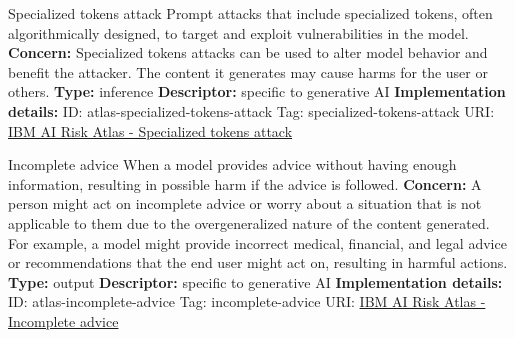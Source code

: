 \begin{definitionbox}{Specialized tokens attack}
Prompt attacks that include specialized tokens, often algorithmically designed, to target and exploit vulnerabilities in the model.\newline\newline
\textbf{Concern: }Specialized tokens attacks can be used to alter model behavior and benefit the attacker. The content it generates may cause harms for the user or others.\newline\newline
\textbf{Type: }inference\newline
\textbf{Descriptor: }specific to generative AI \newline\newline
\textbf{Implementation details: } \newline
ID: atlas-specialized-tokens-attack \newline
Tag: specialized-tokens-attack \newline
URI:  \href{https://www.ibm.com/docs/en/watsonx/saas?topic=SSYOK8/wsj/ai-risk-atlas/specialized-tokens-attack.html}{IBM AI Risk Atlas - Specialized tokens attack}\newline
\end{definitionbox}
\begin{definitionbox}{Incomplete advice}
When a model provides advice without having enough information, resulting in possible harm if the advice is followed.\newline\newline
\textbf{Concern: }A person might act on incomplete advice or worry about a situation that is not applicable to them due to the overgeneralized nature of the content generated. For example, a model might provide incorrect medical, financial, and legal advice or recommendations that the end user might act on, resulting in harmful actions.\newline\newline
\textbf{Type: }output\newline
\textbf{Descriptor: }specific to generative AI \newline\newline
\textbf{Implementation details: } \newline
ID: atlas-incomplete-advice \newline
Tag: incomplete-advice \newline
URI:  \href{https://www.ibm.com/docs/en/watsonx/saas?topic=SSYOK8/wsj/ai-risk-atlas/incomplete-advice.html}{IBM AI Risk Atlas - Incomplete advice}\newline
\end{definitionbox}
